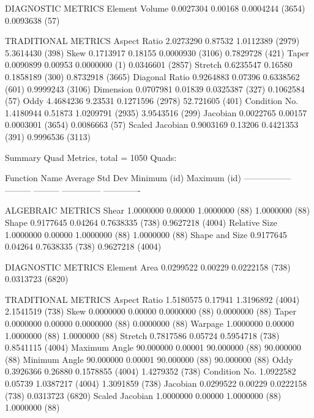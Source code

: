 \documentclass[10pt]{report}
\begin{document}
\begin{example}
{DIAGNOSTIC METRICS
    Element Volume  0.0027304   0.00168   0.0004244 (3654)  0.0093638 (57)

TRADITIONAL METRICS
      Aspect Ratio  2.0273290   0.87532   1.0112389 (2979)  5.3614430 (398)
              Skew  0.1713917   0.18155   0.0000930 (3106)  0.7829728 (421)
             Taper  0.0090899   0.00953   0.0000000 (1)  0.0346601 (2857)
           Stretch  0.6235547   0.16580   0.1858189 (300)  0.8732918 (3665)
    Diagonal Ratio  0.9264883   0.07396   0.6338562 (601)  0.9999243 (3106)
         Dimension  0.0707981   0.01839   0.0325387 (327)  0.1062584 (57)
              Oddy  4.4684236   9.23531   0.1271596 (2978)  52.721605 (401)
     Condition No.  1.4180944   0.51873   1.0209791 (2935)  3.9543516 (299)
          Jacobian  0.0022765   0.00157   0.0003001 (3654)  0.0086663 (57)
   Scaled Jacobian  0.9003169   0.13206   0.4421353 (391)  0.9996536 (3113)

Summary Quad Metrics, total = 1050 Quads:

   Function Name     Average    Std Dev    Minimum   (id)  Maximum  (id)
 -----------------  ---------  ---------  --------------  -------------

ALGEBRAIC METRICS
             Shear  1.0000000   0.00000   1.0000000 (88)  1.0000000 (88)
             Shape  0.9177645   0.04264   0.7638335 (738)  0.9627218 (4004)
     Relative Size  1.0000000   0.00000   1.0000000 (88)  1.0000000 (88)
    Shape and Size  0.9177645   0.04264   0.7638335 (738)  0.9627218 (4004)

DIAGNOSTIC METRICS
      Element Area  0.0299522   0.00229   0.0222158 (738)  0.0313723 (6820)

TRADITIONAL METRICS
      Aspect Ratio  1.5180575   0.17941   1.3196892 (4004)  2.1541519 (738)
              Skew  0.0000000   0.00000   0.0000000 (88)  0.0000000 (88)
             Taper  0.0000000   0.00000   0.0000000 (88)  0.0000000 (88)
           Warpage  1.0000000   0.00000   1.0000000 (88)  1.0000000 (88)
           Stretch  0.7817586   0.05724   0.5954718 (738)  0.8541115 (4004)
     Maximum Angle  90.000000   0.00001   90.000000 (88)  90.000000 (88)
     Minimum Angle  90.000000   0.00001   90.000000 (88)  90.000000 (88)
              Oddy  0.3926366   0.26880   0.1578855 (4004)  1.4279352 (738)
     Condition No.  1.0922582   0.05739   1.0387217 (4004)  1.3091859 (738)
          Jacobian  0.0299522   0.00229   0.0222158 (738)  0.0313723 (6820)
   Scaled Jacobian  1.0000000   0.00000   1.0000000 (88)  1.0000000 (88)

}
\end{example}
\end{document}
